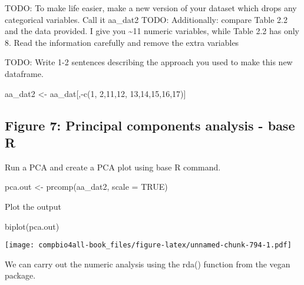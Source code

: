 \documentclass[
]{book}
\newenvironment{Shaded}{\begin{snugshade}}{\end{snugshade}}
\newcommand{\AttributeTok}[1]{\textcolor[rgb]{0.77,0.63,0.00}{#1}}
\newcommand{\ConstantTok}[1]{\textcolor[rgb]{0.00,0.00,0.00}{#1}}
\newcommand{\DecValTok}[1]{\textcolor[rgb]{0.00,0.00,0.81}{#1}}
\newcommand{\FunctionTok}[1]{\textcolor[rgb]{0.00,0.00,0.00}{#1}}
\newcommand{\NormalTok}[1]{#1}
\newcommand{\OtherTok}[1]{\textcolor[rgb]{0.56,0.35,0.01}{#1}}
\newcommand{\SpecialCharTok}[1]{\textcolor[rgb]{0.00,0.00,0.00}{#1}}
\begin{document}
TODO: To make life easier, make a new version of your dataset which drops any categorical variables. Call it aa\_dat2
TODO: Additionally: compare Table 2.2 and the data provided. I give you \textasciitilde11 numeric variables, while Table 2.2 has only 8. Read the information carefully and remove the extra variables

TODO: Write 1-2 sentences describing the approach you used to make this new dataframe.

\begin{Shaded}
\begin{Highlighting}[]
\NormalTok{aa\_dat2 }\OtherTok{\textless{}{-}}\NormalTok{ aa\_dat[,}\SpecialCharTok{{-}}\FunctionTok{c}\NormalTok{(}\DecValTok{1}\NormalTok{,}
                      \DecValTok{2}\NormalTok{,}\DecValTok{11}\NormalTok{,}\DecValTok{12}\NormalTok{,}
                      \DecValTok{13}\NormalTok{,}\DecValTok{14}\NormalTok{,}\DecValTok{15}\NormalTok{,}\DecValTok{16}\NormalTok{,}\DecValTok{17}\NormalTok{)]}
\end{Highlighting}
\end{Shaded}

\hypertarget{figure-7-principal-components-analysis---base-r-1}{%
\subsection{Figure 7: Principal components analysis - base R}\label{figure-7-principal-components-analysis---base-r-1}}

Run a PCA and create a PCA plot using base R command.

\begin{Shaded}
\begin{Highlighting}[]
\NormalTok{pca.out }\OtherTok{\textless{}{-}} \FunctionTok{prcomp}\NormalTok{(aa\_dat2, }\AttributeTok{scale =} \ConstantTok{TRUE}\NormalTok{)}
\end{Highlighting}
\end{Shaded}

Plot the output

\begin{Shaded}
\begin{Highlighting}[]
\FunctionTok{biplot}\NormalTok{(pca.out)}
\end{Highlighting}
\end{Shaded}

\texttt{[image: compbio4all-book\_files/figure-latex/unnamed-chunk-794-1.pdf]}

We can carry out the numeric analysis using the rda() function from the vegan package.
\end{document}
